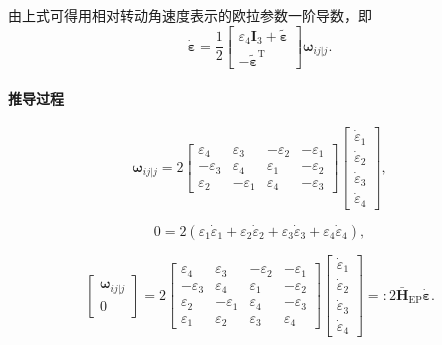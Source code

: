 由上式可得用相对转动角速度表示的欧拉参数一阶导数，即
\begin{equation}
    \dot{\bm{\varepsilon}} = \frac{1}{2}\begin{bmatrix}
        \varepsilon_4\bm{I}_3 + \tilde{\bm{\varepsilon}}\\
        -\tilde{\bm{\varepsilon}}^{\mathrm{T}}
    \end{bmatrix}
    \bm{\omega}_{ij|j}.
\end{equation}

\paragraph*{推导过程}

\begin{equation}
    \bm{\omega}_{ij|j} = 2\begin{bmatrix}
        \varepsilon_4 & \varepsilon_3 & -\varepsilon_2 & -\varepsilon_1\\
        -\varepsilon_3 & \varepsilon_4 & \varepsilon_1 & -\varepsilon_2\\
        \varepsilon_2 & -\varepsilon_1 & \varepsilon_4 & -\varepsilon_3
    \end{bmatrix}
    \begin{bmatrix}
        \dot{\varepsilon}_1\\
        \dot{\varepsilon}_2\\
        \dot{\varepsilon}_3\\
        \dot{\varepsilon}_4
    \end{bmatrix},
\end{equation}

\begin{equation}
    0 = 2(\varepsilon_1\dot{\varepsilon}_1 + \varepsilon_2\dot{\varepsilon}_2 + \varepsilon_3\dot{\varepsilon}_3 + \varepsilon_4\dot{\varepsilon}_4),
\end{equation}

\begin{equation}
    \begin{bmatrix}
        \bm{\omega}_{ij|j}\\
        0
    \end{bmatrix}
    = 2\begin{bmatrix}
        \varepsilon_4 & \varepsilon_3 & -\varepsilon_2 & -\varepsilon_1\\
        -\varepsilon_3 & \varepsilon_4 & \varepsilon_1 & -\varepsilon_2\\
        \varepsilon_2 & -\varepsilon_1 & \varepsilon_4 & -\varepsilon_3\\
        \varepsilon_1 & \varepsilon_2 & \varepsilon_3 & \varepsilon_4
    \end{bmatrix}
    \begin{bmatrix}
        \dot{\varepsilon}_1\\
        \dot{\varepsilon}_2\\
        \dot{\varepsilon}_3\\
        \dot{\varepsilon}_4
    \end{bmatrix}
    =: 2\bar{\bm{H}}_{\mathrm{EP}}\dot{\bm{\varepsilon}}.
\end{equation}

